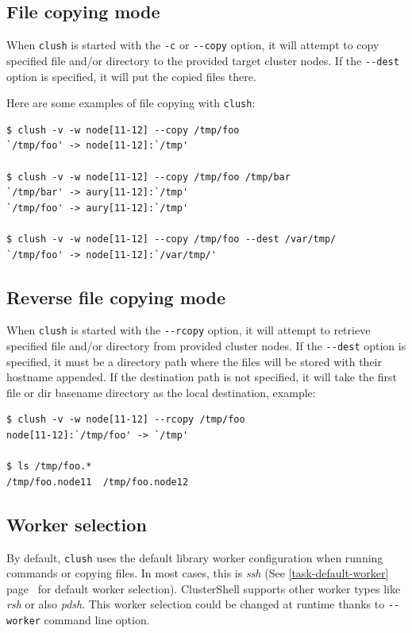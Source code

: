 \documentclass[english,a4paper]{csuserguide}
\newcommand{\clush}{\texttt{clush}\xspace}
\begin{document}
\subsection{File copying mode}

When \clush is started with  the \verb+-c+  or  \verb+--copy+  option, it will attempt to copy specified file and/or directory to the provided target cluster nodes. If the \verb+--dest+ option is specified, it will put the copied files there.

Here are some examples of file copying with \clush:
\bigskip

\begin{lstlisting}[breaklines=true, breakatwhitespace=true]
$ clush -v -w node[11-12] --copy /tmp/foo
`/tmp/foo' -> node[11-12]:`/tmp'

$ clush -v -w node[11-12] --copy /tmp/foo /tmp/bar
`/tmp/bar' -> aury[11-12]:`/tmp'
`/tmp/foo' -> aury[11-12]:`/tmp'

$ clush -v -w node[11-12] --copy /tmp/foo --dest /var/tmp/
`/tmp/foo' -> node[11-12]:`/var/tmp/'
\end{lstlisting}

\pagebreak[4]

\subsection{Reverse file copying mode}

When \clush  is started with the \verb+--rcopy+ option, it will attempt to retrieve specified file and/or directory from provided cluster nodes.  If the \verb+--dest+ option is specified, it must be a directory path where the files will  be  stored  with  their hostname appended. If the destination path is not specified, it will take the first file or dir basename directory as the local destination, example:
\bigskip

\begin{lstlisting}[breaklines=true, breakatwhitespace=true]
$ clush -v -w node[11-12] --rcopy /tmp/foo
node[11-12]:`/tmp/foo' -> `/tmp'

$ ls /tmp/foo.*
/tmp/foo.node11  /tmp/foo.node12
\end{lstlisting}

\subsection{Worker selection}

By default, \clush uses the default library worker configuration when running commands or copying files. In most cases, this is \textit{ssh} (See \ref{task-default-worker} page~\pageref{task-default-worker} for default worker selection). ClusterShell supports other worker types like \textit{rsh} or also \textit{pdsh}. This worker selection could be changed at runtime thanks to \verb+--worker+ command line option.
\end{document}
